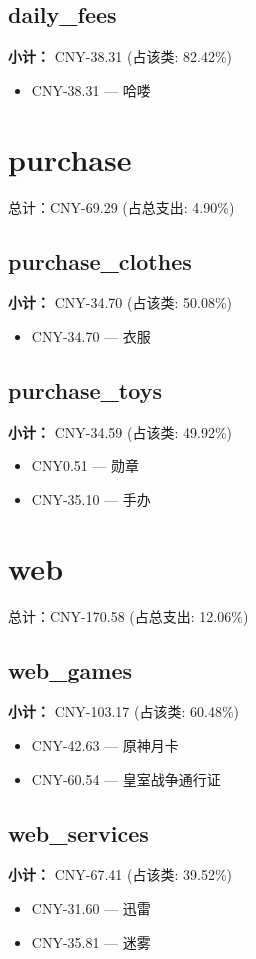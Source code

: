 \documentclass[12pt]{article}
\begin{document}
\subsection*{daily\_fees}
\textbf{小计：} CNY-38.31 (占该类: 82.42\%)
\begin{itemize}
    \item CNY-38.31 --- 哈喽
\end{itemize}
\section*{purchase}
总计：CNY-69.29 	 (占总支出: 4.90\%)

\subsection*{purchase\_clothes}
\textbf{小计：} CNY-34.70 (占该类: 50.08\%)
\begin{itemize}
    \item CNY-34.70 --- 衣服
\end{itemize}
\subsection*{purchase\_toys}
\textbf{小计：} CNY-34.59 (占该类: 49.92\%)
\begin{itemize}
    \item CNY0.51 --- 勋章
    \item CNY-35.10 --- 手办
\end{itemize}
\section*{web}
总计：CNY-170.58 	 (占总支出: 12.06\%)

\subsection*{web\_games}
\textbf{小计：} CNY-103.17 (占该类: 60.48\%)
\begin{itemize}
    \item CNY-42.63 --- 原神月卡
    \item CNY-60.54 --- 皇室战争通行证
\end{itemize}
\subsection*{web\_services}
\textbf{小计：} CNY-67.41 (占该类: 39.52\%)
\begin{itemize}
    \item CNY-31.60 --- 迅雷
    \item CNY-35.81 --- 迷雾
\end{itemize}
\end{document}
